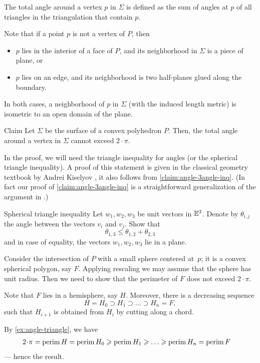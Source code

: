 The total angle around a vertex $p$ in $\Sigma$ is defined as the sum of angles at $p$ of all triangles in the triangulation that contain $p$.

Note that if a point $p$ is not a vertex of $P$,
then
\begin{itemize}
\item $p$ lies in the interior of a face of $P$, and its neighborhood in $\Sigma$ is a piece of plane, or
\item $p$ lies on an edge, and its neighborhood is two half-planes glued along the boundary.
\end{itemize}
In both cases, a neighborhood of $p$ in $\Sigma$ (with the induced length metric) is isometric to an open domain of the plane.

\begin{thm}{Claim}\label{clm:total-angle}
Let $\Sigma$ be the surface of a convex polyhedron $P$.
Then, the total angle around a vertex in $\Sigma$ cannot exceed $2\cdot\pi$.
\end{thm} 


In the proof, we will need the triangle inequality for angles (or the spherical triangle inequality).
A proof of this statement is given in the classical geometry textbook by Andrei Kiselyov \cite[§ 47]{kiselev-stereo-en},
it also follows from \ref{claim:angle-3angle-inq}.
(In fact our proof of \ref{claim:angle-3angle-inq} is a straightforward generalization of the argument in \cite[§ 47]{kiselev-stereo-en}.)

\begin{thm}{Spherical triangle inequality}\label{ex:angle-triangle}
Let $w_1,w_2,w_3$ be unit vectors in $\mathbb{E}^3$.
Denote by $\theta_{i,j}$ the angle between the vectors $v_i$ and $v_j$.
Show that
$$\theta_{1,3}\le \theta_{1,2}+\theta_{2,3}$$
and in case of equality, the vectors $w_1,w_2,w_3$ lie in a plane.
\end{thm}

Consider the intersection of $P$ with a small sphere centered at~$p$;
it is a convex spherical polygon, say $F$.
Applying rescaling we may assume that the sphere has unit radius.
Then we need to show that the perimeter of $F$ does not exceed $2\cdot\pi$.

Note that $F$ lies in a hemisphere, say $H$.
Moreover, there is a decreasing sequence 
\[H=H_0\supset H_1\supset\dots\supset H_n=F,\]
such that $H_{i+1}$ is obtained from $H_{i}$ by cutting along a chord.

By \ref{ex:angle-triangle}, we have
\begin{align*}
2\cdot\pi=\perim H=\perim H_0&\ge\perim H_1\ge\dots\ge\perim H_n=\perim F
\end{align*}
--- hence the result.
\qedsf

